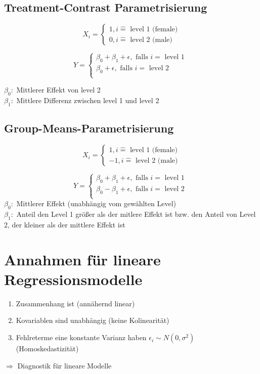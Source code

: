 \subsection{Treatment-Contrast Parametrisierung}
\[ X_i = \begin{cases}
		1, i \hat{=} \text{ level 1 (female)} \\
		0, i \hat{=} \text{ level 2 (male)}
\end{cases} \]

\[ Y = \begin{cases}
		\beta_0 + \beta_1 + \epsilon, \text{ falls } i = \text{ level 1 } \\
		\beta_0 + \epsilon, \text{ falls } i = \text{ level 2 } \\
\end{cases} \]

$\beta_0:$ Mittlerer Effekt von level 2\\
$\beta_1:$ Mittlere Differenz zwischen level 1 und level 2\\

\subsection{Group-Means-Parametrisierung}
\[ X_i = \begin{cases}
		1, i \hat{=} \text{ level 1 (female)} \\
		-1, i \hat{=} \text{ level 2 (male)}
\end{cases} \]

\[ Y = \begin{cases}
		\beta_0 + \beta_1 + \epsilon, \text{ falls } i = \text{ level 1 } \\
		\beta_0 - \beta_1 + \epsilon, \text{ falls } i = \text{ level 2 } \\
\end{cases} \]
$\beta_0:$ Mittlerer Effekt (unabhängig vom gewählten Level)\\
$\beta_1:$ Anteil den Level 1 größer als der mitlere Effekt ist bzw. den Anteil von Level 2, der kleiner als der mittlere Effekt ist\\

\section{Annahmen für lineare Regressionsmodelle}
\begin{enumerate}
	\item Zusammenhang ist (annähernd linear)
	\item Kovariablen sind unabhängig (keine Kolinearität)
	\item Fehlreterme eine konstante Varianz haben $\epsilon_i \sim N(0, \sigma^{2} )$ (Homoskedastizität)
\end{enumerate}
$\Rightarrow$ Diagnostik für lineare Modelle

